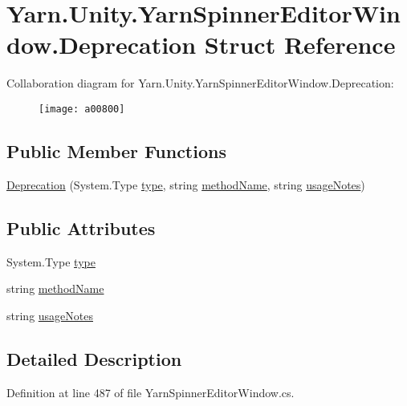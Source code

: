 \hypertarget{a00092}{\section{Yarn.\-Unity.\-Yarn\-Spinner\-Editor\-Window.\-Deprecation Struct Reference}
\label{a00092}
}


Collaboration diagram for Yarn.\-Unity.\-Yarn\-Spinner\-Editor\-Window.\-Deprecation\-:
\nopagebreak
\begin{figure}[H]
\begin{center}
\leavevmode
\texttt{[image: a00800]}
\end{center}
\end{figure}
\subsection*{Public Member Functions}
\begin{DoxyCompactItemize}
\item 
\hyperlink{a00092_ae80171841e97a48611c51a9a574a2fc0}{Deprecation} (System.\-Type \hyperlink{a00092_a750904df254223bf3131c39017f90a0b}{type}, string \hyperlink{a00092_a61605b2d0a17dfdf9c62952270d44fbd}{method\-Name}, string \hyperlink{a00092_ac23509be7ae6b43a3e2154dd430954a7}{usage\-Notes})
\end{DoxyCompactItemize}
\subsection*{Public Attributes}
\begin{DoxyCompactItemize}
\item 
System.\-Type \hyperlink{a00092_a750904df254223bf3131c39017f90a0b}{type}
\item 
string \hyperlink{a00092_a61605b2d0a17dfdf9c62952270d44fbd}{method\-Name}
\item 
string \hyperlink{a00092_ac23509be7ae6b43a3e2154dd430954a7}{usage\-Notes}
\end{DoxyCompactItemize}


\subsection{Detailed Description}


Definition at line 487 of file Yarn\-Spinner\-Editor\-Window.\-cs.



